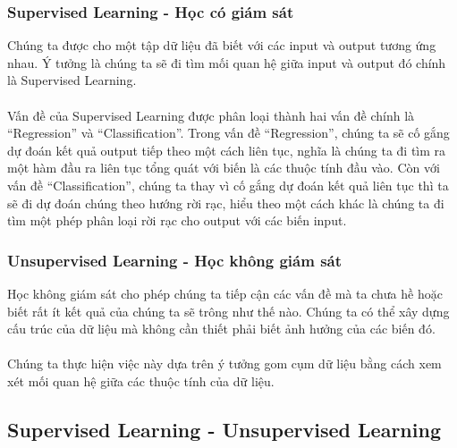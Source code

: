 \subsubsection{Supervised Learning - Học có giám sát}
Chúng ta được cho một tập dữ liệu đã biết với các input và output tương ứng
nhau. Ý tưởng là chúng ta sẽ đi tìm mối quan hệ giữa input và output đó chính là
Supervised Learning.\\\\
Vấn đề của Supervised Learning được phân loại thành hai
vấn đề chính là “Regression” và “Classification”. Trong vấn đề “Regression”,
chúng ta sẽ cố gắng dự đoán kết quả output tiếp theo một cách liên tục, nghĩa là
chúng ta đi tìm ra một hàm đầu ra liên tục tổng quát với biến là các thuộc tính
đầu vào. Còn với vấn đề “Classification”, chúng ta thay vì cố gắng dự đoán kết
quả liên tục thì ta sẽ đi dự đoán chúng theo hướng rời rạc, hiểu theo một cách
khác là chúng ta đi tìm một phép phân loại rời rạc cho output với các biến
input.
\subsubsection{Unsupervised Learning - Học không giám sát}
Học không giám sát cho phép chúng ta tiếp cận các vấn đề mà ta chưa hề hoặc biết
rất ít kết quả của chúng ta sẽ trông như thế nào. Chúng ta có thể xây dựng cấu
trúc của dữ liệu mà không cần thiết phải biết ảnh hưởng của các biến đó.\\\\
Chúng ta thực hiện việc này dựa trên ý tưởng gom cụm dữ liệu bằng cách xem xét
mối quan hệ giữa các thuộc tính của dữ liệu.
\subsection{Supervised Learning - Unsupervised Learning}

